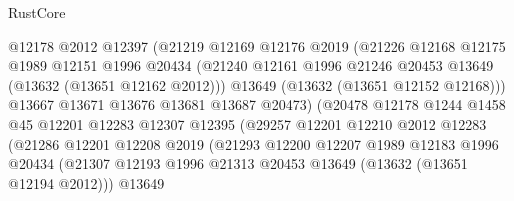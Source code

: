 \begin{lexlean}{RustCore}
\begin{coremodule}
                              @12178
                              @2012
                              @12397
                              (@21219
                                @12169
                                @12176
                                @2019
                                (@21226
                                  @12168
                                  @12175
                                  @1989
                                  @12151
                                  @1996
                                  @20434
                                  (@21240
                                    @12161
                                    @1996
                                    @21246
                                    @20453
                                    @13649
                                    (@13632 (@13651 @12162 @2012)))
                                  @13649
                                  (@13632 (@13651 @12152 @12168)))
                                @13667
                                @13671
                                @13676
                                @13681
                                @13687
                                @20473)
                              (@20478
                                @12178
                                @1244
                                @1458
                                @45
                                @12201
                                @12283
                                @12307
                                @12395
                                (@29257
                                  @12201
                                  @12210
                                  @2012
                                  @12283
                                  (@21286
                                    @12201
                                    @12208
                                    @2019
                                    (@21293
                                      @12200
                                      @12207
                                      @1989
                                      @12183
                                      @1996
                                      @20434
                                      (@21307
                                        @12193
                                        @1996
                                        @21313
                                        @20453
                                        @13649
                                        (@13632 (@13651 @12194 @2012)))
                                      @13649

\end{coremodule}
\end{lexlean}
